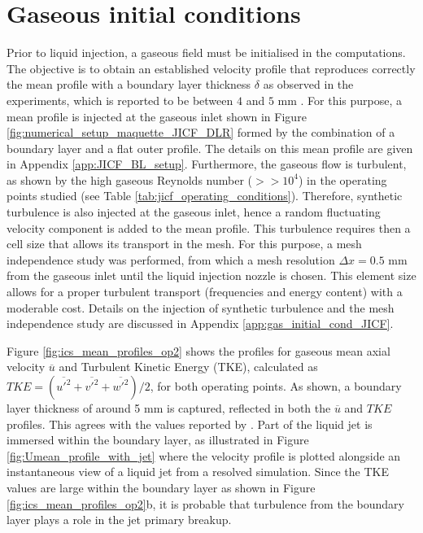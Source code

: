 \clearpage

\section{Gaseous initial conditions}
\label{sec:ch5_initial_conditions}

Prior to liquid injection, a gaseous field must be initialised in the computations. The objective is to obtain an established velocity profile that reproduces correctly the mean profile with a boundary layer thickness $\delta$ as observed in the experiments, which is reported to be between $4$ and $5$ mm . For this purpose, a mean profile is injected at the gaseous inlet shown in Figure \ref{fig:numerical_setup_maquette_JICF_DLR} formed by the combination of a boundary layer and a flat outer profile. The details on this mean profile are given in Appendix \ref{app:JICF_BL_setup}. Furthermore, the gaseous flow is turbulent, as shown by the high gaseous Reynolds number ($>> 10^4$) in the operating points studied (see Table \ref{tab:jicf_operating_conditions}). Therefore, synthetic turbulence is also injected at the gaseous inlet, hence a random fluctuating velocity component is added to the mean profile. This turbulence requires then a cell size that allows its transport in the mesh. For this purpose, a mesh independence study was performed, from which a mesh resolution $\Delta x = 0.5$ mm from the gaseous inlet until the liquid injection nozzle is chosen. This element size allows for a proper turbulent transport (frequencies
and energy content) with a moderable cost. Details on the injection of synthetic turbulence and the mesh independence study are discussed in Appendix \ref{app:gas_initial_cond_JICF}. 

Figure \ref{fig:ics_mean_profiles_op2} shows the profiles for gaseous mean axial velocity $\overline{u}$ and Turbulent Kinetic Energy (TKE), calculated as $TKE = \left( \overline{u'^2} + \overline{v'^2} + \overline{w'^2} \right) / 2$, for both operating points. As shown, a boundary layer thickness of around 5 mm is captured, reflected in both the $\overline{u}$ and $TKE$ profiles. This agrees with the values reported by . Part of the liquid jet is immersed within the boundary layer, as illustrated in Figure \ref{fig:Umean_profile_with_jet} where the velocity profile is plotted alongside an instantaneous view of a liquid jet from a resolved simulation. Since the TKE values are large within the boundary layer as shown in Figure \ref{fig:ics_mean_profiles_op2}b, it is probable that turbulence from the boundary layer plays a role in the jet primary breakup.

